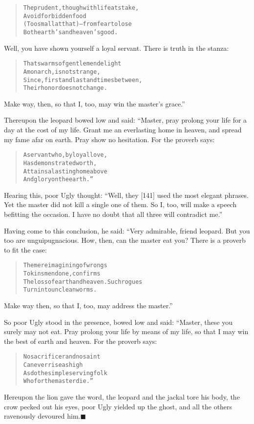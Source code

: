 \documentclass[article, twoside, 14pt]{memoir}
\newcommand{\qed}{\hfill \ensuremath{\blacksquare}}
\renewenvironment{verbatim}{%
\begin{quote}%
\vskip -10pt%
\begin{alltt}\normalfont\large}{\end{alltt}%
\end{quote}%
\vskip -10pt
} %
\begin{document}
\begin{verbatim}
The prudent, though with life at stake,
    Avoid forbidden food
(Too small at that)--from fear to lose
    Both earth's and heaven's good.
\end{verbatim}
Well, you have shown yourself a loyal servant. There is truth in
the stanza:

\begin{verbatim}
That swarms of gentlemen delight
    A monarch, is not strange,
Since, first and last and times between,
    Their honor does not change.
\end{verbatim}
Make way, then, so that I, too, may win the master's grace.”

Thereupon the leopard bowed low and said: “Master, pray prolong
your life for a day at the cost of my life. Grant me an everlasting
home in heaven, and spread my fame afar on earth. Pray show no
hesitation. For the proverb says:

\begin{verbatim}
A servant who, by loyal love,
    Has demonstrated worth,
Attains a lasting home above
    And glory on the earth.”
\end{verbatim}
Hearing this, poor Ugly thought:
``Well, they [141] used the most elegant phrases. Yet the master did not kill a single one of them. So I, too, will make a speech befitting the occasion. I have no doubt that all three will contradict me.''

Having come to this conclusion, he said: “Very admirable, friend
leopard. But you too are unguipugnacious. How, then, can the master
eat you? There is a proverb to fit the case:

\begin{verbatim}
The mere imagining of wrongs
    To kinsmen done, confirms
The loss of earth and heaven. Such rogues
    Turn into unclean worms.
\end{verbatim}
Make way then, so that I, too, may address the master.”

So poor Ugly stood in the presence, bowed low and said: “Master,
these you surely may not eat. Pray prolong your life by means of my
life, so that I may win the best of earth and heaven. For the
proverb says:

\begin{verbatim}
No sacrificer and no saint
    Can ever rise as high
As do the simple servingfolk
    Who for the master die.”
\end{verbatim}
Hereupon the lion gave the word, the leopard and the jackal tore
his body, the crow pecked out his eyes, poor Ugly yielded up the
ghost, and all the others ravenously devoured
him.\hyperref[s16]{\qed}
\end{document}
